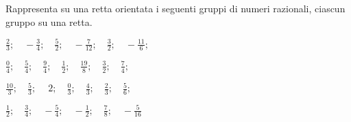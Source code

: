 \subsubsection*{}

\begin{esercizio}
\label{ese:3.26}
Rappresenta su una retta orientata i seguenti gruppi di numeri razionali, 
ciascun gruppo su una retta.

\begin{htmulticols}{2}
\begin{enumeratees}
\spazielenx
 \item 
\(\displaystyle{\frac{2}{3};\quad-\frac{3}{4};\quad\frac{5}{2};\quad
-\frac{7}{12};\quad\frac{3}{2};\quad -\frac{11}{6};
}
\)
 \item 
\(\displaystyle{\frac{0}{4};\quad\frac{5}{4};\quad\frac{9}{4};\quad
\frac{1}{2};\quad\frac{19}{8};\quad\frac{3}{2};\quad\frac{7}{4};
}
\)
 \item 
\(\displaystyle{\frac{10}{3};\quad\frac{5}{3};\quad~2;\quad
\frac{0}{3};\quad\frac{4}{3};\quad\frac{2}{3};\quad\frac{5}{6};
}
\)
 \item 
\(\displaystyle{\frac{1}{2};\quad\frac{3}{4};\quad-\frac{5}{4};
\quad-\frac{1}{2};\quad\frac{7}{8};\quad -\frac{5}{16}}
\)
 \end{enumeratees}
\end{htmulticols}
\end{esercizio}

